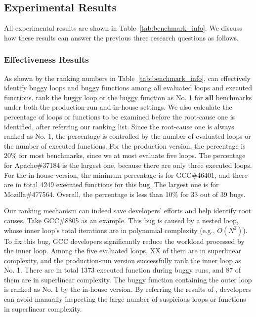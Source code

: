 \subsection{Experimental Results}
\label{sec:results}

All experimental results are shown in Table~\ref{tab:benchmark_info}.
We discuss how these results can answer the previous three research questions as follows.


\subsubsection{Effectiveness Results}
As shown by the ranking numbers in Table~\ref{tab:benchmark_info},
\Tool can effectively identify buggy loops and buggy functions 
among all evaluated loops and executed functions. 
\Tool rank the buggy loop or the buggy function as No. 1 
for \textbf{all} benchmarks under both the production-run and in-house settings. 
We also calculate the percentage of loops or functions 
to be examined before the root-cause one is identified, 
after referring our ranking list. 
Since the root-cause one is always ranked as No. 1,
the percentage is controlled by the number of evaluated loops 
or the number of executed functions. 
For the production version, the percentage is $20\%$ for most benchmarks, 
since we at most evaluate five loops. 
The percentage for Apache\#37184 is the largest one, 
because there are only three executed loops. 
For the in-house version, the minimum percentage is for GCC\#46401, 
and there are in total 4249 executed functions for this bug.
The largest one is for Mozilla\#477564. 
Overall, the percentage is less than 10\% for 33 out of 39 bugs. 

Our ranking mechanism can indeed save developers' efforts 
and help identify root causes. 
Take GCC\#8805 as an example.
This bug is caused by a nested loop, 
whose inner loop's total iterations are in polynomial complexity (e.g., $O(N^2)$).
To fix this bug, GCC developers significantly reduce 
the workload processed by the inner loop. 
Among the five evaluated loops, {\color{red} XX} of them are in superlinear complexity, 
and the production-run version successfully rank the inner loop as No. 1.
There are in total 1373 executed function during buggy runs,
and 87 of them are in superlinear complexity. 
The buggy function containing the outer loop is ranked as No. 1 
by the in-house version. 
By referring the results of \Tool, 
developers can avoid manually inspecting the large number of  
suspicious loops or functions in superlinear complexity. 

